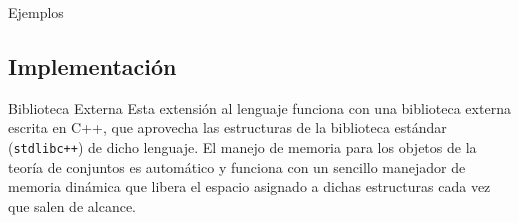 
\begin{frame}{Ejemplos}
\settheory{}
\end{frame}

\subsection*{Implementación}

\begin{frame}{Biblioteca Externa}
Esta extensión al lenguaje funciona con una biblioteca externa escrita en C++, 
que aprovecha las estructuras de la biblioteca estándar (\texttt{stdlibc++}) 
de dicho lenguaje. El manejo de memoria para los objetos de la teoría de 
conjuntos es automático y funciona con un sencillo manejador de memoria 
dinámica que libera el espacio asignado a dichas estructuras cada vez que salen 
de alcance.
\end{frame}





